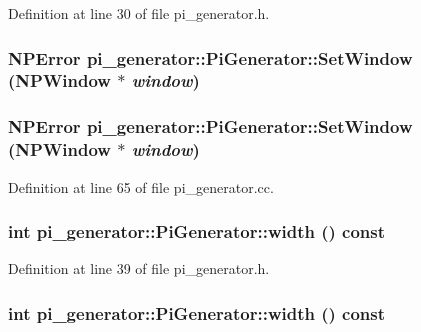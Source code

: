 Definition at line 30 of file pi\_\-generator.h.

\hypertarget{classpi__generator_1_1_pi_generator_ad19c9de44971a5c08ee8e26a45598f38}{
\subsubsection[{SetWindow}]{\setlength{\rightskip}{0pt plus 5cm}NPError pi\_\-generator::PiGenerator::SetWindow (NPWindow $\ast$ {\em window})}}
\label{classpi__generator_1_1_pi_generator_ad19c9de44971a5c08ee8e26a45598f38}
\hypertarget{classpi__generator_1_1_pi_generator_ad19c9de44971a5c08ee8e26a45598f38}{
\subsubsection[{SetWindow}]{\setlength{\rightskip}{0pt plus 5cm}NPError pi\_\-generator::PiGenerator::SetWindow (NPWindow $\ast$ {\em window})}}
\label{classpi__generator_1_1_pi_generator_ad19c9de44971a5c08ee8e26a45598f38}


Definition at line 65 of file pi\_\-generator.cc.

\hypertarget{classpi__generator_1_1_pi_generator_ae3b2d276f4cf6209d7653f6fc4437fc4}{
\subsubsection[{width}]{\setlength{\rightskip}{0pt plus 5cm}int pi\_\-generator::PiGenerator::width () const}}
\label{classpi__generator_1_1_pi_generator_ae3b2d276f4cf6209d7653f6fc4437fc4}


Definition at line 39 of file pi\_\-generator.h.

\hypertarget{classpi__generator_1_1_pi_generator_ae3b2d276f4cf6209d7653f6fc4437fc4}{
\subsubsection[{width}]{\setlength{\rightskip}{0pt plus 5cm}int pi\_\-generator::PiGenerator::width () const}}
\label{classpi__generator_1_1_pi_generator_ae3b2d276f4cf6209d7653f6fc4437fc4}


